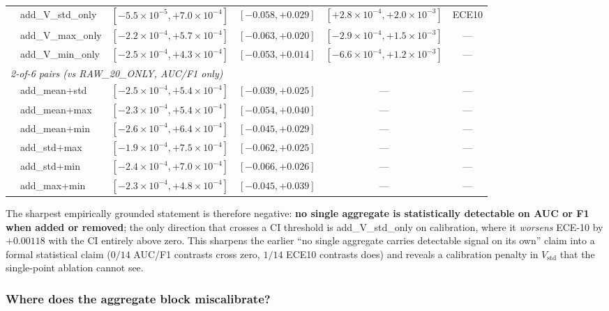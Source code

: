 \begin{table}[t]
\begin{tabular}{llcccc}
& add\_V\_std\_only  & $[-5.5\!\times\!10^{-5}, +7.0\!\times\!10^{-4}]$ & $[-0.058, +0.029]$ & $[+2.8\!\times\!10^{-4}, +2.0\!\times\!10^{-3}]$ & ECE10 \\
& add\_V\_max\_only  & $[-2.2\!\times\!10^{-4}, +5.7\!\times\!10^{-4}]$ & $[-0.063, +0.020]$ & $[-2.9\!\times\!10^{-4}, +1.5\!\times\!10^{-3}]$ & --- \\
& add\_V\_min\_only  & $[-2.5\!\times\!10^{-4}, +4.3\!\times\!10^{-4}]$ & $[-0.053, +0.014]$ & $[-6.6\!\times\!10^{-4}, +1.2\!\times\!10^{-3}]$ & --- \\
\midrule
\multicolumn{6}{l}{\emph{2-of-6 pairs (vs RAW\_20\_ONLY, AUC/F1 only)}} \\
& add\_mean+std & $[-2.5\!\times\!10^{-4}, +5.4\!\times\!10^{-4}]$ & $[-0.039, +0.025]$ & --- & --- \\
& add\_mean+max & $[-2.3\!\times\!10^{-4}, +5.4\!\times\!10^{-4}]$ & $[-0.054, +0.040]$ & --- & --- \\
& add\_mean+min & $[-2.6\!\times\!10^{-4}, +6.4\!\times\!10^{-4}]$ & $[-0.045, +0.029]$ & --- & --- \\
& add\_std+max  & $[-1.9\!\times\!10^{-4}, +7.5\!\times\!10^{-4}]$ & $[-0.062, +0.025]$ & --- & --- \\
& add\_std+min  & $[-2.4\!\times\!10^{-4}, +7.0\!\times\!10^{-4}]$ & $[-0.066, +0.026]$ & --- & --- \\
& add\_max+min  & $[-2.3\!\times\!10^{-4}, +4.8\!\times\!10^{-4}]$ & $[-0.045, +0.039]$ & --- & --- \\
\bottomrule
\end{tabular}
\end{table}

The sharpest empirically grounded statement is therefore negative:
\textbf{no single aggregate is statistically detectable on AUC or F1
when added or removed}; the only direction that crosses a CI
threshold is \textsf{add\_V\_std\_only} on calibration, where it
\emph{worsens} ECE-10 by $+0.00118$ with the CI entirely above zero.
This sharpens the earlier ``no single aggregate carries detectable
signal on its own'' claim into a formal statistical claim
($0/14$ AUC/F1 contrasts cross zero, $1/14$ ECE10 contrasts does)
and reveals a calibration penalty in $V_{\text{std}}$ that the single-point
ablation cannot see.

\subsubsection{Where does the aggregate block miscalibrate?}

